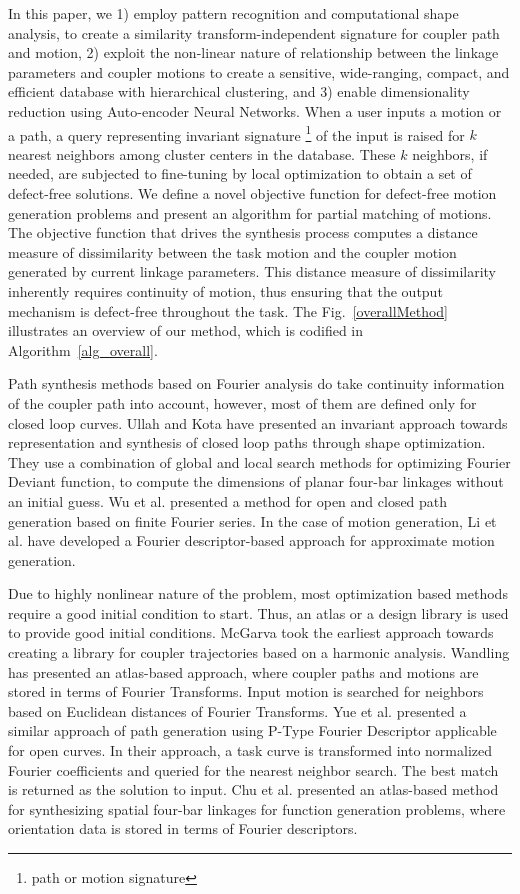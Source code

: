 \documentclass[twocolumn,10pt]{asme2e}
\begin{document}
In this paper, we 1) employ pattern recognition and computational shape analysis, to create a similarity transform-independent signature for coupler path and motion, 2) exploit the non-linear nature of relationship between the linkage parameters and coupler motions to create a sensitive, wide-ranging, compact, and efficient database with hierarchical clustering, and 3) enable dimensionality reduction using Auto-encoder Neural Networks.
When a user inputs a motion or a path, a query representing invariant signature \footnote{path or motion signature} of the input is raised for $k$ nearest neighbors among cluster centers in the database.
These $k$ neighbors, if needed, are subjected to fine-tuning by local optimization to obtain a set of defect-free solutions.
We define a novel objective function for defect-free motion generation problems and present an algorithm for partial matching of motions.
The objective function that drives the synthesis process computes a distance measure of dissimilarity between the task motion and the coupler motion generated by current linkage parameters.
This distance measure of dissimilarity inherently requires continuity of motion, thus ensuring that the output mechanism is defect-free throughout the task.
The Fig.~\ref{overallMethod} illustrates an overview of our method, which is codified in Algorithm~\ref{alg_overall}.

Path synthesis methods based on Fourier analysis do take continuity information of the coupler path into account, however, most of them are defined only for closed loop curves.
Ullah and Kota\cite{ullah1997} have presented an invariant approach towards representation and synthesis of closed loop paths through shape optimization.
They use a combination of global and local search methods for optimizing Fourier Deviant function, to compute the dimensions of planar four-bar linkages without an initial guess.
Wu et al.\cite{wu2011} presented a method for open and closed path generation based on finite Fourier series.
In the case of motion generation, Li et al.\cite{li2016} have developed a Fourier descriptor-based approach for approximate motion generation.

Due to highly nonlinear nature of the problem, most optimization based methods require a good initial condition to start.
Thus, an atlas or a design library is used to provide good initial conditions.
McGarva\cite{mcgarva1994} took the earliest approach towards creating a library for coupler trajectories based on a harmonic analysis.
Wandling\cite{wandling2000} has presented an atlas-based approach, where coupler paths and motions are stored in terms of Fourier Transforms.
Input motion is searched for neighbors based on Euclidean distances of Fourier Transforms.
Yue et al.\cite{yue-pathgen2011} presented a similar approach of path generation using P-Type Fourier Descriptor applicable for open curves.
In their approach, a task curve is transformed into normalized Fourier coefficients and queried for the nearest neighbor search.
The best match is returned as the solution to input.
Chu et al.\cite{chu2010} presented an atlas-based method for synthesizing spatial four-bar linkages for function generation problems, where orientation data is stored in terms of Fourier descriptors.
\end{document}
